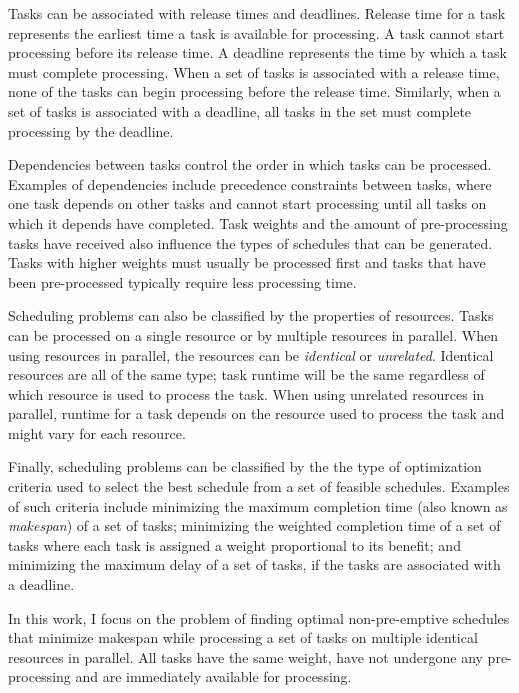 \documentclass[12pt]{report}
\begin{document}
Tasks can be associated with release times and deadlines.
Release time for a task represents the earliest time a task is available for processing.
A task cannot start processing before its release time.
A deadline represents the time by which a task must complete processing.
When a set of tasks is associated with a release time, none of the tasks can begin processing before the release time.
Similarly, when a set of tasks is associated with a deadline, all tasks in the set must complete processing by the deadline.

Dependencies between tasks control the order in which tasks can be processed.
Examples of dependencies include precedence constraints between tasks, where one task depends on other tasks and cannot start processing until all tasks on which it depends have completed.
Task weights and the amount of pre-processing tasks have received also influence the types of schedules that can be generated.
Tasks with higher weights must usually be processed first and tasks that have been pre-processed typically require less processing time.

Scheduling problems can also be classified by the properties of resources.
Tasks can be processed on a single resource or by multiple resources in parallel.
When using resources in parallel, the resources can be \textit{identical} or \textit{unrelated}.
Identical resources are all of the same type; task runtime will be the same regardless of which resource is used to process the task.
When using unrelated resources in parallel, runtime for a task depends on the resource used to process the task and might vary for each resource.

Finally, scheduling problems can be classified by the the type of optimization criteria used to select the best schedule from a set of feasible schedules.
Examples of such criteria include minimizing the maximum completion time (also known as \textit{makespan}) of a set of tasks; minimizing the weighted completion time of a set of tasks where each task is assigned a weight proportional to its benefit; and minimizing the maximum delay of a set of tasks, if the tasks are associated with a deadline.

In this work, I focus on the problem of finding optimal non-pre-emptive schedules that minimize makespan while processing a set of tasks on multiple identical resources in parallel. All tasks have the same weight, have not undergone any pre-processing and are immediately available for processing.

\end{document}
